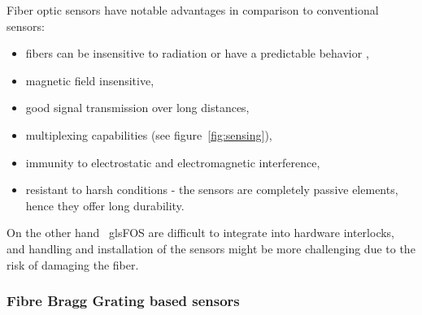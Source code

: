 Fiber optic sensors have notable advantages in comparison to conventional sensors:

\begin{itemize}
    \item fibers can be insensitive to radiation or have a predictable behavior \cite{fos_radiation},
    \item magnetic field insensitive,
    \item good signal transmission over long distances,
    \item multiplexing capabilities (see figure~\ref{fig:sensing}),
    \item immunity to electrostatic and electromagnetic interference,
    \item resistant to harsh conditions - the sensors are completely passive elements, hence they offer long durability.
\end{itemize}
On the other hand \, gls{FOS} are difficult to integrate into hardware interlocks, and handling and installation of the sensors might be more challenging due to the risk of damaging the fiber.




\subsubsection{Fibre Bragg Grating based sensors}

